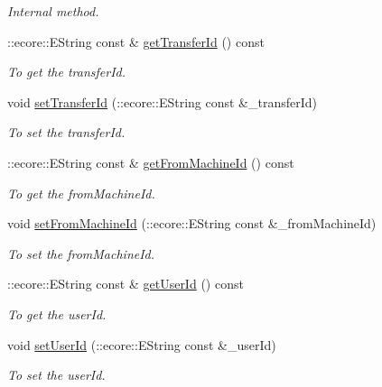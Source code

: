 \begin{DoxyCompactItemize}
\begin{DoxyCompactList}\small\item\em Internal method. \item\end{DoxyCompactList}\item 
::ecore::EString const \& \hyperlink{classFMS__Data_1_1LsTransferOptions_af763568e3cc10f1d417fc7f6a2a7586f}{getTransferId} () const 
\begin{DoxyCompactList}\small\item\em To get the transferId. \item\end{DoxyCompactList}\item 
void \hyperlink{classFMS__Data_1_1LsTransferOptions_ac1bc02717817d26b865f6efa26919b76}{setTransferId} (::ecore::EString const \&\_\-transferId)
\begin{DoxyCompactList}\small\item\em To set the transferId. \item\end{DoxyCompactList}\item 
::ecore::EString const \& \hyperlink{classFMS__Data_1_1LsTransferOptions_a4a3da34a785b9d3584bd393892d8dd88}{getFromMachineId} () const 
\begin{DoxyCompactList}\small\item\em To get the fromMachineId. \item\end{DoxyCompactList}\item 
void \hyperlink{classFMS__Data_1_1LsTransferOptions_ae9808de9e3d045cffedd09a6d54f0136}{setFromMachineId} (::ecore::EString const \&\_\-fromMachineId)
\begin{DoxyCompactList}\small\item\em To set the fromMachineId. \item\end{DoxyCompactList}\item 
::ecore::EString const \& \hyperlink{classFMS__Data_1_1LsTransferOptions_a63b74919adab3da913be7b650066860a}{getUserId} () const 
\begin{DoxyCompactList}\small\item\em To get the userId. \item\end{DoxyCompactList}\item 
void \hyperlink{classFMS__Data_1_1LsTransferOptions_a79eb00ce43f60ff313a53636647b8587}{setUserId} (::ecore::EString const \&\_\-userId)
\begin{DoxyCompactList}\small\item\em To set the userId. \item\end{DoxyCompactList}\item 

\end{DoxyCompactItemize}
